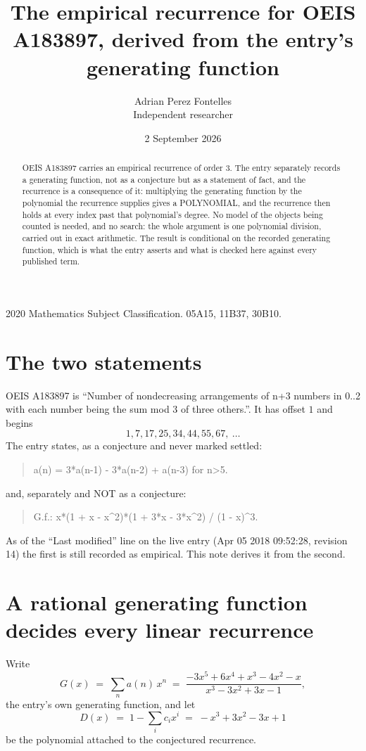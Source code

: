 \documentclass[11pt,a4paper]{article}
\title{The empirical recurrence for OEIS A183897, derived from the entry's generating function}
\author{Adrian Perez Fontelles\\ \small Independent researcher}
\date{2 September 2026}
\theoremstyle{plain}
\theoremstyle{definition}
\begin{document}
\maketitle

\begin{abstract}
OEIS A183897 carries an empirical recurrence of order $3$. The entry separately records a
generating function, not as a conjecture but as a statement of fact, and the recurrence is a
consequence of it: multiplying the generating function by the polynomial the recurrence
supplies gives a POLYNOMIAL, and the recurrence then holds at every index past that
polynomial's degree. No model of the objects being counted is needed, and no search: the
whole argument is one polynomial division, carried out in exact arithmetic. The result is
conditional on the recorded generating function, which is what the entry asserts and what is
checked here against every published term.
\end{abstract}

\noindent\small 2020 Mathematics Subject Classification. 05A15, 11B37, 30B10.\normalsize

\section{The two statements}

OEIS A183897 is ``Number of nondecreasing arrangements of n+3 numbers in 0..2 with each number being the sum mod 3 of three others.''. It has offset $1$ and begins
\[
1, 7, 17, 25, 34, 44, 55, 67,\ \dots
\]
The entry states, as a conjecture and never marked settled:
\begin{quote}
a(n) = 3*a(n-1) - 3*a(n-2) + a(n-3) for n>5.
\end{quote}
and, separately and NOT as a conjecture:
\begin{quote}
G.f.: x*(1 + x - x\^{}2)*(1 + 3*x - 3*x\^{}2) / (1 - x)\^{}3.
\end{quote}
As of the ``Last modified'' line on the live entry (Apr 05 2018 09:52:28, revision 14) the first is still
recorded as empirical. This note derives it from the second.

\section{A rational generating function decides every linear recurrence}

Write
\[
G(x)\;=\;\sum_{n}a(n)\,x^{n}\;=\;\frac{- 3 x^{5} + 6 x^{4} + x^{3} - 4 x^{2} - x}{x^{3} - 3 x^{2} + 3 x - 1},
\]
the entry's own generating function, and let
\[
D(x)\;=\;1-\sum_i c_i x^{i}\;=\;- x^{3} + 3 x^{2} - 3 x + 1
\]
be the polynomial attached to the conjectured recurrence.
\end{document}
